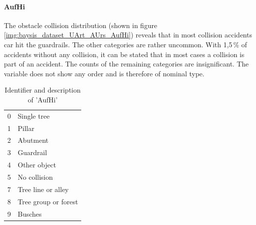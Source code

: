 \paragraph{AufHi}
The obstacle collision distribution (shown in figure \autoref{img:baysis_dataset_UArt_AUrs_AufHi}) reveals that in most collision accidents car hit the guardrails. The other categories are rather uncommon. With 1,5\,\% of accidents without any collision, it can be stated that in most cases a collision is part of an accident. The counts of the remaining categories are insignificant. The variable does not show any order and is therefore of nominal type.
\noindent
\begin{table}[ht]
	\centering
	\begin{tabular}{c|l}  
		0 & Single tree \\
		1 & Pillar \\
		2 & Abutment \\
		3 & Guardrail \\
		4 & Other object \\
		5 & No collision \\
		7 & Tree line or alley \\
		8 & Tree group or forest \\
		9 & Busches \\
	\end{tabular}
	\caption{Identifier and description of 'AufHi'}
	\label{table:baysis_dataset_AufHi}
\end{table}

